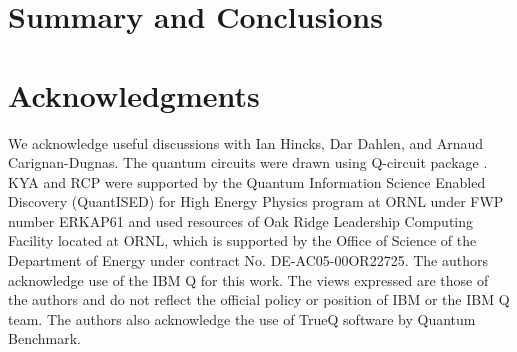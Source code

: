 \section{Summary and Conclusions}
\label{sec:summary_conc}

\section{Acknowledgments}


We acknowledge useful discussions with Ian Hincks, Dar Dahlen, and Arnaud Carignan-Dugnas. The quantum circuits were drawn using Q-circuit package \cite{QCircuit}.
KYA and RCP were supported by the Quantum Information Science Enabled Discovery (QuantISED) for High Energy Physics program at ORNL under FWP number ERKAP61 and used resources of Oak Ridge Leadership Computing Facility located at ORNL, which is supported by the Office of Science of the Department of Energy under contract No. DE-AC05-00OR22725.
 The authors acknowledge use of the IBM Q for this work. The views expressed are those of the authors and do not reflect the official policy or position of IBM or the IBM Q team. The authors also acknowledge the use of TrueQ software by Quantum Benchmark.
